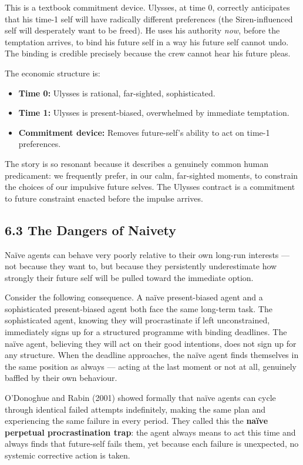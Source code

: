 \documentclass[12pt, letterpaper]{article}
\begin{document}
This is a textbook commitment device. Ulysses, at time 0, correctly anticipates that his time-1 self will have radically different preferences (the Siren-influenced self will desperately want to be freed). He uses his authority \textit{now}, before the temptation arrives, to bind his future self in a way his future self cannot undo. The binding is credible precisely because the crew cannot hear his future pleas.

The economic structure is:
\begin{itemize}
\item \textbf{Time 0:} Ulysses is rational, far-sighted, sophisticated.
\item \textbf{Time 1:} Ulysses is present-biased, overwhelmed by immediate temptation.
\item \textbf{Commitment device:} Removes future-self's ability to act on time-1 preferences.
\end{itemize}

The story is so resonant because it describes a genuinely common human predicament: we frequently prefer, in our calm, far-sighted moments, to constrain the choices of our impulsive future selves. The Ulysses contract is a commitment to future constraint enacted before the impulse arrives.


\subsection{6.3 The Dangers of Naivety}


Naïve agents can behave very poorly relative to their own long-run interests --- not because they want to, but because they persistently underestimate how strongly their future self will be pulled toward the immediate option.

Consider the following consequence. A naïve present-biased agent and a sophisticated present-biased agent both face the same long-term task. The sophisticated agent, knowing they will procrastinate if left unconstrained, immediately signs up for a structured programme with binding deadlines. The naïve agent, believing they will act on their good intentions, does not sign up for any structure. When the deadline approaches, the naïve agent finds themselves in the same position as always --- acting at the last moment or not at all, genuinely baffled by their own behaviour.

O'Donoghue and Rabin (2001) showed formally that naïve agents can cycle through identical failed attempts indefinitely, making the same plan and experiencing the same failure in every period. They called this the \textbf{naïve perpetual procrastination trap}: the agent always means to act this time and always finds that future-self fails them, yet because each failure is unexpected, no systemic corrective action is taken.
\end{document}
